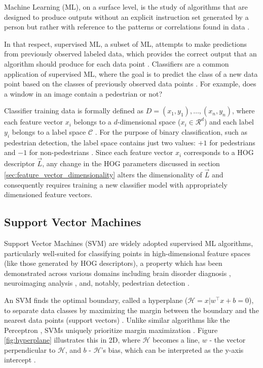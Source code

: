 Machine Learning (ML), on a surface level, is the study of algorithms that are designed to produce outputs without an explicit instruction set generated by a person but rather with reference to the patterns or correlations found in data \cite{what_is_ml}. 

In that respect, supervised ML, a subset of ML, attempts to make predictions from previously observed labeled data, which provides the correct output that an algorithm should produce for each data point \cite{supervised_learning}. Classifiers are a common application of supervised ML, where the goal is to predict the class of a new data point based on the classes of previously observed data points \cite{derek_2020_svm}. For example, does a window in an image contain a pedestrian or not?

Classifier training data is formally defined as $D={ (x_{1},y_{1}),\dots,(x_{n},y_{n}) }$, where each feature vector $x_i$ belongs to a $d$-dimensional space ($x_i\in \mathcal{R}^d$) and each label $y_i$ belongs to a label space $\mathcal{C}$ \cite{supervised_learning}. For the purpose of binary classification, such as pedestrian detection, the label space contains just two values: $+1$ for pedestrians and $-1$ for non-pedestrians \cite{cornell_svm}. Since each feature vector $x_i$ corresponds to a HOG descriptor $\vec{L}$, any change in the HOG parameters discussed in section \ref{sec:feature_vector_dimensionality} alters the dimensionality of $\vec{L}$ and consequently requires training a new classifier model with appropriately dimensioned feature vectors.

\subsection{Support Vector Machines}

Support Vector Machines (SVM) are widely adopted supervised ML algorithms, particularly well-suited for classifying points in high-dimensional feature spaces \cite{ng_support} (like those generated by HOG descriptors), a property which has been demonstrated across various domains including brain disorder diagnosis \cite{derek_2020_svm}, neuroimaging analysis \cite{svm_mri}, and, notably, pedestrian detection \cite{dalal_2005_histograms}.

An SVM finds the optimal boundary, called a hyperplane ($\mathcal{H}={ x|w^\top x + b = 0 }$), to separate data classes by maximizing the margin between the boundary and the nearest data points (support vectors) \cite{derek_2020_svm} \cite{cornell_svm_notes}. Unlike similar algorithms like the Perceptron \cite{cornell_perceptron}, SVMs uniquely prioritize margin maximization \cite{ng_support}. Figure \ref{fig:hyperplane} illustrates this in 2D, where $\mathcal{H}$ becomes a line, $w$ - the vector perpendicular to $\mathcal{H}$, and $b$ - $\mathcal{H}$'s bias, which can be interpreted as the y-axis intercept \cite{cornell_svm_notes}.

